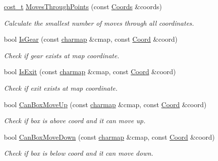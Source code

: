 \begin{DoxyCompactItemize}
\hyperlink{namespaceboxedin_ae2b1ff7be48e8d543a64922e65788e04}{cost\+\_\+t} \hyperlink{namespaceboxedin_ac46d077e735ae30753839875e93c84a9}{Moves\+Through\+Points} (const \hyperlink{namespaceboxedin_adfad3f57ac730784b07eeef6e6244ceb}{Coords} \&coords)
\begin{DoxyCompactList}\small\item\em Calculate the smallest number of moves through all coordinates. \end{DoxyCompactList}\item 
bool \hyperlink{namespaceboxedin_a7528d80c5829dd05691b97d65c8825dc}{Is\+Gear} (const \hyperlink{namespaceboxedin_a95e88d677e0a17d3f9e4a9b0de980c4f}{charmap} \&cmap, const \hyperlink{namespaceboxedin_afc0dedc740afcefb60a4dac20d984b16}{Coord} \&coord)
\begin{DoxyCompactList}\small\item\em Check if gear exists at map coordinate. \end{DoxyCompactList}\item 
bool \hyperlink{namespaceboxedin_ad392c9ccb82570febc39b69e579a2bef}{Is\+Exit} (const \hyperlink{namespaceboxedin_a95e88d677e0a17d3f9e4a9b0de980c4f}{charmap} \&cmap, const \hyperlink{namespaceboxedin_afc0dedc740afcefb60a4dac20d984b16}{Coord} \&coord)
\begin{DoxyCompactList}\small\item\em Check if exit exists at map coordinate. \end{DoxyCompactList}\item 
bool \hyperlink{namespaceboxedin_ade6b00c044daae22e3210444e3859a2e}{Can\+Box\+Move\+Up} (const \hyperlink{namespaceboxedin_a95e88d677e0a17d3f9e4a9b0de980c4f}{charmap} \&cmap, const \hyperlink{namespaceboxedin_afc0dedc740afcefb60a4dac20d984b16}{Coord} \&coord)
\begin{DoxyCompactList}\small\item\em Check if box is above coord and it can move up. \end{DoxyCompactList}\item 
bool \hyperlink{namespaceboxedin_a024b3dd298c0c13f748655e0f957fa57}{Can\+Box\+Move\+Down} (const \hyperlink{namespaceboxedin_a95e88d677e0a17d3f9e4a9b0de980c4f}{charmap} \&cmap, const \hyperlink{namespaceboxedin_afc0dedc740afcefb60a4dac20d984b16}{Coord} \&coord)
\begin{DoxyCompactList}\small\item\em Check if box is below coord and it can move down. \end{DoxyCompactList}\item 

\end{DoxyCompactItemize}
